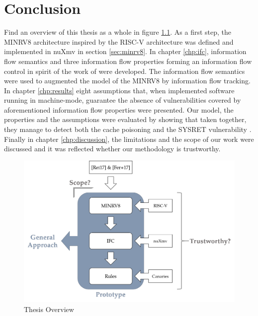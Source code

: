 
\chapter{Conclusion}
\label{chp:conclusion}

Find an overview of this thesis as a whole in figure \ref{fig:overview}.
As a first step, the MINRV8 architecture inspired by the RISC-V architecture was defined and implemented in nuXmv in section \ref{sec:minrv8}.
In chapter \ref{chp:ifc}, information flow semantics and three information flow properties forming an information flow control in spirit of the work of \citeauthor{Ferraiuolo17} \cite{Ferraiuolo17} were developed.
The information flow semantics were used to augmented the model of the MINRV8 by information flow tracking.
In chapter \ref{chp:results} eight assumptions that, when implemented software running in machine-mode, guarantee the absence of vulnerabilities covered by aforementioned information flow properties were presented.
Our model, the properties and the assumptions were evaluated by showing that taken together, they manage to detect both the cache poisoning \cite{Wojtczuk09} and the SYSRET vulnerability \cite{Dunlap19}.
Finally in chapter \ref{chp:discussion}, the limitations and the scope of our work were discussed and it was reflected whether our methodology is trustworthy.

\begin{figure}
    \centering
    \includegraphics[width=\textwidth]{figures/thesis-overview.png}
    \caption{Thesis Overview}
    \label{fig:overview}
\end{figure}

